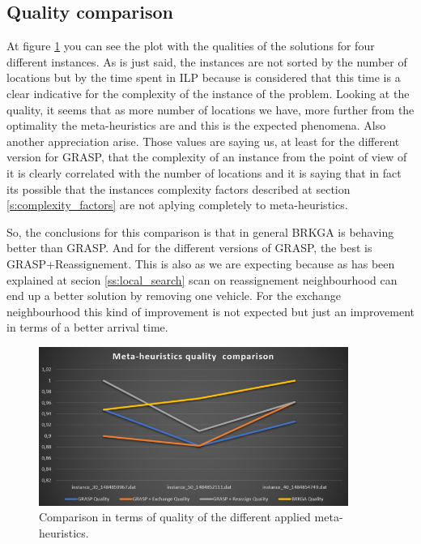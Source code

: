 \documentclass[]{report}
\begin{document}
\subsection{Quality comparison}

At figure \ref{img:metaheuristics_quality_comparison} you can see the plot with the qualities of the solutions for four different instances. As is just said, the instances are not sorted by the number of locations but by the time spent in ILP because is considered that this time is a clear indicative for the complexity of the instance of the problem. Looking at the quality, it seems that as more number of locations we have, more further from the optimality the meta-heuristics are and this is the expected phenomena. Also another appreciation arise. Those values are saying us, at least for the different version for GRASP, that the complexity of an instance from the point of view of it is clearly correlated with the number of locations and it is saying that in fact its possible that the instances complexity factors described at section \ref{s:complexity_factors} are not aplying completely to meta-heuristics.

So, the conclusions for this comparison is that in general BRKGA is behaving better than GRASP. And for the different versions of GRASP, the best is GRASP+Reassignement. This is also as we are expecting because as has been explained at secion \ref{ss:local_search} scan on reassignement neighbourhood can end up a better solution by removing one vehicle. For the exchange neighbourhood this kind of improvement is not expected but just an improvement in terms of a better arrival time.

\begin{figure}
	\caption{Comparison in terms of quality of the different applied meta-heuristics.}
	\label{img:metaheuristics_quality_comparison}
	\centering
	\includegraphics[width=0.9\textwidth]{./imgs/metaheuristic_quality_comparison.png}
\end{figure}
\end{document}
